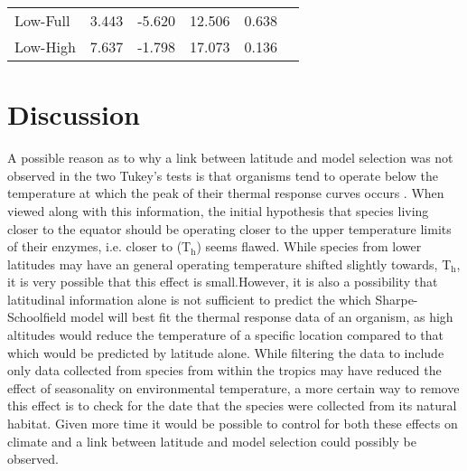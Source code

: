 \documentclass[a4paper, 11pt]{article}
\begin{document}
\begin{linenumbers}
\begin{table}[ht]
\begin{tabular}{llllll}
Low-Full  & 3.443               & -5.620               & 12.506               & 0.638     \\

Low-High  & 7.637               & -1.798               & 17.073               & 0.136     \\               

\end{tabular}
\end{table}

\section{Discussion}

A possible reason as to why a link between latitude and model selection was not observed in the two Tukey's tests is that organisms tend to operate below the temperature at which the peak of their  thermal response curves occurs \citep{martin2008suboptimal}. When viewed along with this information, the initial hypothesis that species living closer to the equator should be operating closer to the upper temperature limits of their enzymes, i.e. closer to (T$_{\text{h}}$) seems flawed. While species from lower latitudes may have an general operating temperature shifted slightly towards, T$_{\text{h}}$, it is very possible that this effect is small.However, it is also a possibility that latitudinal information alone is not sufficient to predict the which Sharpe-Schoolfield model will best fit the thermal response data of an organism, as high altitudes would reduce the temperature of a specific location compared to that which would be predicted by latitude alone. While filtering the data to include only data collected from species from within the tropics may have reduced the effect of seasonality on environmental temperature, a more certain way to remove this effect is to check for the date that the species were collected from its natural habitat. Given more time it would be possible to control for both these effects on climate and a link between latitude and model selection could possibly be observed.


\end{linenumbers}
\end{document}
